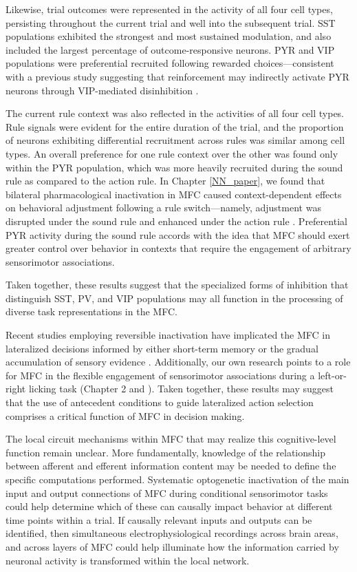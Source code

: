 Likewise, trial outcomes were represented in the activity of all four cell types, persisting throughout the current trial and well into the subsequent trial. SST populations exhibited the strongest and most sustained modulation, and also included the largest percentage of outcome-responsive neurons. PYR and VIP populations were preferential recruited following rewarded choices---consistent with a previous study suggesting that reinforcement may indirectly activate PYR neurons through VIP-mediated disinhibition \citep{pi13}.  

The current rule context was also reflected in the activities of all four cell types. Rule signals were evident for the entire duration of the trial, and the proportion of neurons exhibiting differential recruitment across rules was similar among cell types. An overall preference for one rule context over the other was found only within the PYR population, which was more heavily recruited during the sound rule as compared to the action rule. In Chapter \ref{NN_paper}, we found that bilateral pharmacological inactivation in MFC caused context-dependent effects on behavioral adjustment following a rule switch---namely, adjustment was disrupted under the sound rule and enhanced under the action rule \citep{siniscalchi2016fast}. Preferential PYR activity during the sound rule accords with the idea that MFC should exert greater control over behavior in contexts that require the engagement of arbitrary sensorimotor associations. 

Taken together, these results suggest that the specialized forms of inhibition that distinguish SST, PV, and VIP populations may all function in the processing of diverse task representations in the MFC.  


Recent studies employing reversible inactivation have implicated the MFC in lateralized decisions informed by either short-term memory \citep{erlich2011cortical,guo2014flow,kopec2015cortical} or the gradual accumulation of sensory evidence \citep{erlich2015distinct,hanks2015distinct}. Additionally, our own research points to a role for MFC in the flexible engagement of sensorimotor associations during a left-or-right licking task (Chapter 2 and \cite{siniscalchi2016fast}). Taken together, these results may suggest that the use of antecedent conditions to guide lateralized action selection comprises a critical function of MFC in decision making.

The local circuit mechanisms within MFC that may realize this cognitive-level function remain unclear. More fundamentally, knowledge of the relationship between afferent and efferent information content may be needed to define the specific computations performed. Systematic optogenetic inactivation of the main input and output connections of MFC during conditional sensorimotor tasks could help determine which of these can causally impact behavior at different time points within a trial. If causally relevant inputs and outputs can be identified, then simultaneous electrophysiological recordings across brain areas, and across layers of MFC could help illuminate how the information carried by neuronal activity is transformed within the local network.  

